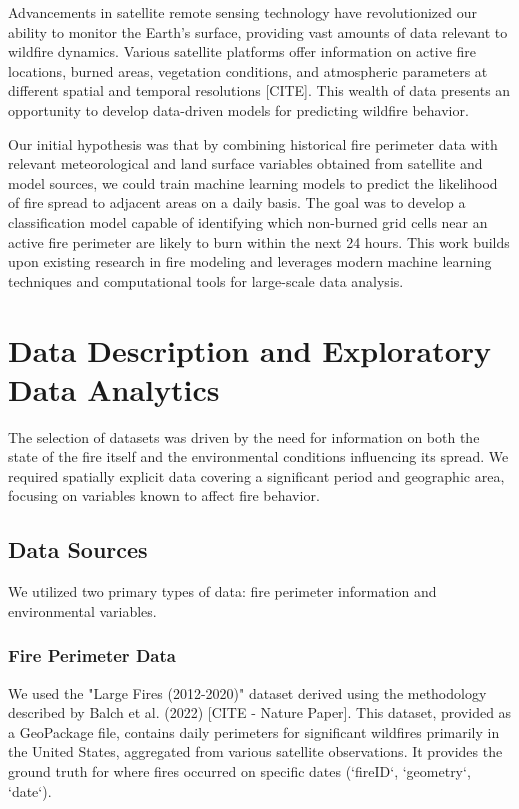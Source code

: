 \documentclass[conference]{IEEEtran}
\begin{document}
Advancements in satellite remote sensing technology have revolutionized our ability to monitor the Earth's surface, providing vast amounts of data relevant to wildfire dynamics. Various satellite platforms offer information on active fire locations, burned areas, vegetation conditions, and atmospheric parameters at different spatial and temporal resolutions [CITE]. This wealth of data presents an opportunity to develop data-driven models for predicting wildfire behavior.

Our initial hypothesis was that by combining historical fire perimeter data with relevant meteorological and land surface variables obtained from satellite and model sources, we could train machine learning models to predict the likelihood of fire spread to adjacent areas on a daily basis. The goal was to develop a classification model capable of identifying which non-burned grid cells near an active fire perimeter are likely to burn within the next 24 hours. This work builds upon existing research in fire modeling and leverages modern machine learning techniques and computational tools for large-scale data analysis.

\section{Data Description and Exploratory Data Analytics}
The selection of datasets was driven by the need for information on both the state of the fire itself and the environmental conditions influencing its spread. We required spatially explicit data covering a significant period and geographic area, focusing on variables known to affect fire behavior.

\subsection{Data Sources}
We utilized two primary types of data: fire perimeter information and environmental variables.

\subsubsection{Fire Perimeter Data}
We used the "Large Fires (2012-2020)" dataset derived using the methodology described by Balch et al. (2022) [CITE - Nature Paper]. This dataset, provided as a GeoPackage file, contains daily perimeters for significant wildfires primarily in the United States, aggregated from various satellite observations. It provides the ground truth for where fires occurred on specific dates (`fireID`, `geometry`, `date`).
\end{document}

